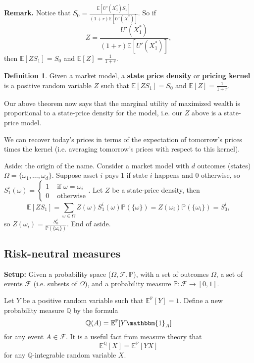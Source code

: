 \documentclass{article}
\theoremstyle{definition}
\newtheorem{defn}{Definition}[section]
\begin{document}
\textbf{Remark.} Notice that $S_0 = \frac{\mathbb{E}[U'(X_1^*)S_1]}{(1+r)\mathbb{E}[U'(X_1^*)]}$. So if $$Z = \frac{U'(X_1^*)}{(1+r)\mathbb{E}[U'(X_1^*)]},$$ then $\mathbb{E}[ZS_1] = S_0$ and $\mathbb{E}[Z]=\frac{1}{1+r}$.

\begin{defn}
    Given a market model, a \textbf{state price density} or \textbf{pricing kernel} is a positive random variable $Z$ such that $\mathbb{E}[ZS_1]=S_0$ and $\mathbb{E}[Z]=\frac{1}{1+r}$.
\end{defn}

Our above theorem now says that the marginal utility of maximized wealth is proportional to a state-price density for the model, i.e. our $Z$ above is a state-price model. 

We can recover today's prices in terms of the expectation of tomorrow's prices times the kernel (i.e. averaging tomorrow's prices with respect to this kernel).

Aside: the origin of the name. Consider a market model with $d$ outcomes (states) $\Omega = \{\omega_1,\ldots,\omega_d\}$. Suppose asset $i$ pays 1 if state $i$ happens and $0$ otherwise, so $S^i_1(\omega) = \begin{cases}
    1 &\text{ if } \omega=\omega_i\\
    0 &\text{ otherwise}
\end{cases}.$ Let $Z$ be a state-price density, then \[
\mathbb{E}[ZS_1] = \sum_{\omega \in \Omega}^{} Z(\omega)S_1^i(\omega)\mathbb{P}(\{\omega\}) = Z(\omega_i)\mathbb{P}(\{\omega_i\}) = S^i_0,
\]
so $Z(\omega_i) = \frac{S_0^i}{\mathbb{P}(\{\omega_i\})}$. End of aside.

\subsection{Risk-neutral measures}
\textbf{Setup:} Given a probability space ($\Omega, \mathcal{F}, \mathbb{P}$), with a set of outcomes $\Omega$, a set of events $\mathcal{F}$ (i.e. subsets of $\Omega$), and a probability measure $\mathbb{P} : \mathcal{F} \to [0,1]$.
\vspace{1mm}

Let $Y$ be a positive random variable such that $\mathbb{E}^{\mathbb{P}}[Y]=1$. Define a new probability measure $\mathbb{Q}$ by the formula \[
\mathbb{Q}(A) = \mathbb{E}^{\mathbb{P}}[Y \mathbbm{1}_A]
\] for any event $A \in \mathcal{F}$. It is a useful fact from measure theory that \[
\mathbb{E}^{\mathbb{Q}}[X] = \mathbb{E}^{\mathbb{P}}[YX]
\] for any $\mathbb{Q}$-integrable random variable $X$.
\vspace{1mm}
\end{document}
